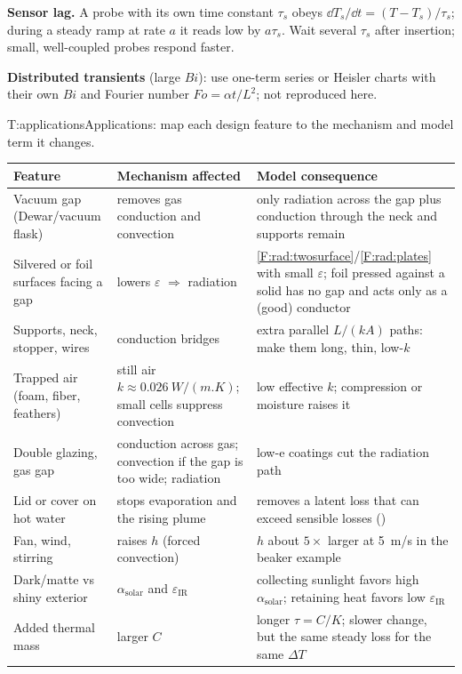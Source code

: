 \begin{multicols}{2}
\textbf{Sensor lag.} A probe with its own time constant $\tau_s$ obeys $\dd T_s/\dd t=(T-T_s)/\tau_s$; during a steady ramp at rate $a$ it reads low by $a\tau_s$. Wait several $\tau_s$ after insertion; small, well-coupled probes respond faster.

\EXT{} \textbf{Distributed transients} (large $Bi$): use one-term series or Heisler charts with their own $Bi$ and Fourier number $Fo=\alpha t/L^2$; not reproduced here.
\end{multicols}

\begin{reftab}{T:applications}{Applications: map each design feature to the mechanism and model term it changes.}
\small
\begin{tabularx}{\textwidth}{@{}L{0.22\textwidth}L{0.30\textwidth}Y@{}}
\toprule
Feature & Mechanism affected & Model consequence\\
\midrule
Vacuum gap (Dewar/vacuum flask) & removes gas conduction and convection & only radiation across the gap plus conduction through the neck and supports remain\\
Silvered or foil surfaces facing a gap & lowers $\varepsilon$ $\Rightarrow$ radiation & \eqref{F:rad:twosurface}/\eqref{F:rad:plates} with small $\varepsilon$; foil pressed against a solid has no gap and acts only as a (good) conductor\\
Supports, neck, stopper, wires & conduction bridges & extra parallel $L/(kA)$ paths: make them long, thin, low-$k$\\
Trapped air (foam, fiber, feathers) & still air $k\approx\SI{0.026}{W/(m.K)}$; small cells suppress convection & low effective $k$; compression or moisture raises it\\
Double glazing, gas gap & conduction across gas; convection if the gap is too wide; radiation & low-e coatings cut the radiation path\\
Lid or cover on hot water & stops evaporation and the rising plume & removes a latent loss that can exceed sensible losses ()\\
Fan, wind, stirring & raises $h$ (forced convection) & $h$ about $5\times$ larger at \SI{5}{m/s} in the beaker example\\
Dark/matte vs shiny exterior & $\alpha_{\text{solar}}$ and $\varepsilon_{\text{IR}}$ & collecting sunlight favors high $\alpha_{\text{solar}}$; retaining heat favors low $\varepsilon_{\text{IR}}$\\
Added thermal mass & larger $C$ & longer $\tau=C/K$; slower change, but the same steady loss for the same $\Delta T$\\
\bottomrule
\end{tabularx}\end{reftab}
